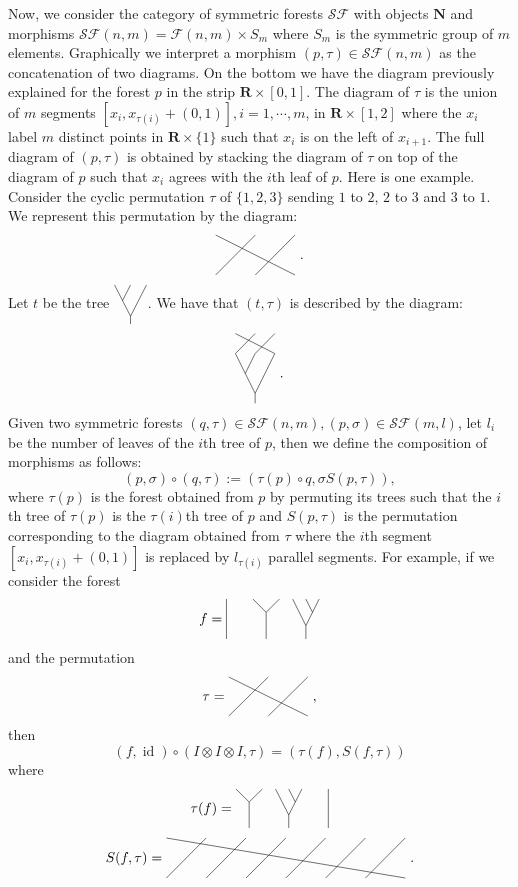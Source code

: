 \documentclass[a4paper,12pt]{amsart}
\numberwithin{equation}{section}
\theoremstyle{definition}
\DeclareMathOperator{\id}{id}
\newcommand{\cF}{\mathcal F}
\newcommand{\N}{\mathbf{N}}
\newcommand{\ot}{\otimes}\newcommand{\otmin}{\otimes_{\text{min}}}
\newcommand{\R}{\mathbf{R}}
\newcommand{\cSF}{\mathcal{SF}}
\begin{document}
Now, we consider the category of symmetric forests $\cSF$ with objects $\N$ and morphisms $\cSF(n,m)=\cF(n,m)\times S_m$ where $S_m$ is the symmetric group of $m$ elements. 
Graphically we interpret a morphism $(p,\tau)\in\cSF(n,m)$ as the concatenation of two diagrams.
On the bottom we have the diagram previously explained for the forest $p$ in the strip $\R\times [0,1]$. 
The diagram of $\tau$ is the union of $m$ segments $[x_i , x_{\tau(i)}+(0,1)], i=1,\cdots,m$, in $\R\times [1,2]$ where the $x_i$ label $m$ distinct points in $\R\times \{1\}$ such that $x_i$ is on the left of $x_{i+1}.$
The full diagram of $(p,\tau)$ is obtained by stacking the diagram of $\tau$ on top of the diagram of $p$ such that $x_i$ agrees with the $i$th leaf of $p$.
\newcommand{\perm}{
\begin{tikzpicture}[baseline = .4cm]
\draw (0,0)--(1,1);
\draw (1,0)--(2,1);
\draw (2,0)--(0,1);
\end{tikzpicture}
}
\newcommand{\taut}{
\begin{tikzpicture}[baseline = .4cm, scale=.5]
\draw (0,0)--(0,-.5);
\draw (0,0)--(-1,2);
\draw (-.5,1)--(0,2);
\draw (0,0)--(1,2);
%
\draw (-1,2)--(0,3);
\draw (0,2)--(1,3);
\draw (1,2)--(-1,3);
\end{tikzpicture}
}
{Here is one example. Consider the cyclic permutation $\tau$ of $\{1,2,3\}$ sending $1$ to $2$, $2$ to $3$ and $3$ to $1$.
We represent this permutation by the diagram:
$$\perm\ .$$
Let $t$ be the tree $\funfun$.
We have that $(t,\tau)$ is described by the diagram:
$$\taut \ .$$
}
Given two symmetric forests $(q,\tau)\in\cSF(n,m), (p, \sigma )\in \cSF(m,l)$, let $l_i$ be the number of leaves of the $i$th tree of $p$, then we define the composition of morphisms as follows:
$$(p,\sigma)\circ (q,\tau) := ( \tau(p) \circ q , \sigma S( p , \tau ) ),$$
where $\tau(p)$ is the forest obtained from $p$ by permuting its trees such that the $i$th tree of $\tau(p)$ is the $\tau(i)$th tree of $p$ and $S(p,\tau)$ is the permutation corresponding to the diagram obtained from $\tau$ where the $i$th segment $[x_i , x_{\tau(i)} + (0,1)]$ is replaced by $l_{\tau(i)}$ parallel segments.
\newcommand{\permtilde}{
\begin{tikzpicture}[baseline = .4cm]
\draw (0,0)--(1,1);
\draw (1,0)--(2,1);
\draw (2,0)--(3,1);
\draw (3,0)--(4,1);
\draw (4,0)--(5,1);
\draw (5,0)--(6,1);
\draw (6,0)--(0,1);
\end{tikzpicture}
}
\newcommand{\foresttilde}{
\begin{tikzpicture}[baseline = .4cm]
\draw (2,0)--(2,1);
\draw (0,0)--(0,2/3);
\draw (0,2/3)--(-1/3,1);
\draw (0,2/3)--(1/3,1);
\draw (1,0)--(1,1/3);
\draw (1,1/3)--(2/3,1);
\draw (1,1/3)--(4/3,1);
\draw (7/6,2/3)--(1,1);
\end{tikzpicture}
}
{For example, if we consider the forest 
$$f = \forest$$ and the permutation $$\tau=\perm\ ,$$ then 
$$(f,\id)\circ (I\ot I \ot I , \tau) = (\tau(f) , S(f,\tau))$$ 
where 
$$\tau(f) = \foresttilde$$  $$S(f,\tau) = \permtilde \ .$$
}
\end{document}

